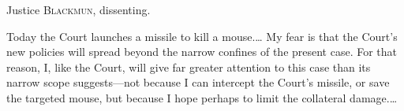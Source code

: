 
\opinion Justice \textsc{Blackmun}, dissenting.

Today the Court launches a missile to kill a mouse.\ldots
%
%
%
My fear is that the Court's new policies will spread beyond the narrow confines
of the present case. For that reason, I, like the Court, will give far greater
attention to this case than its narrow scope suggests---not because I can
intercept the Court's missile, or save the targeted mouse, but because I hope
perhaps to limit the collateral damage.\ldots

